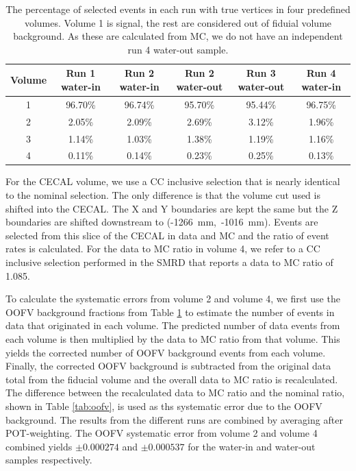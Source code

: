 \begin{table}[h]
\caption{The percentage of selected events in each run with true vertices in four predefined volumes. Volume 1 is signal, the rest are considered out of fiduial volume background. As these are calculated from MC, we do not have an independent run 4 water-out sample.}
\label{tab:oofvfrac}
\centering
\begin{tabular}{cccccc}
\toprule
Volume & Run 1 water-in & Run 2 water-in & Run 2 water-out & Run 3 water-out & Run 4 water-in \\
\midrule
1 & 96.70\% & 96.74\% & 95.70\% & 95.44\% & 96.75\%\\
2 & 2.05\% & 2.09\% & 2.69\% & 3.12\% & 1.96\%\\
3 & 1.14\% & 1.03\% & 1.38\% & 1.19\% & 1.16\%\\
4 & 0.11\% & 0.14\% & 0.23\% & 0.25\% & 0.13\%\\
\bottomrule
\end{tabular}
\end{table}

For the CECAL volume, we use a CC inclusive selection that is nearly identical to the nominal selection. The only difference is that the volume cut used is shifted into the CECAL. The X and Y boundaries are kept the same but the Z boundaries are shifted downstream to (-1266~mm,~-1016~mm). Events are selected from this slice of the CECAL in data and MC and the ratio of event rates is calculated. For the data to MC ratio in volume 4, we refer to a CC inclusive selection performed in the SMRD \cite{smrdtn} that reports a data to MC ratio of 1.085.

To calculate the systematic errors from volume 2 and volume 4, we first use the OOFV background fractions from Table \ref{tab:oofvfrac} to estimate the number of events in data that originated in each volume. The predicted number of data events from each volume is then multiplied by the data to MC ratio from that volume. This yields the corrected number of OOFV background events from each volume. Finally, the corrected OOFV background is subtracted from the original data total from the fiducial volume and the overall data to MC ratio is recalculated. The difference between the recalculated data to MC ratio and the nominal ratio, shown in Table \ref{tab:oofv}, is used as ths systematic error due to the OOFV background. The results from the different runs are combined by averaging after POT-weighting. The OOFV systematic error from volume 2 and volume 4 combined yields $\pm0.000274$ and $\pm0.000537$ for the water-in and water-out samples respectively.

